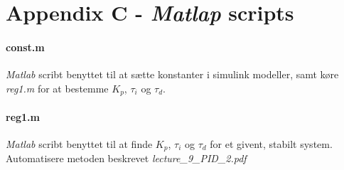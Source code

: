 \section*{Appendix C - \emph{Matlap} scripts}
\paragraph{ const.m }
	\emph{Matlab} scribt benyttet til at sætte konstanter i simulink modeller, samt
	køre \emph{reg1.m} for at bestemme $K_p$, $\tau_i$ og $\tau_d$.

	
\paragraph{ reg1.m }\label{app:reg1}
	\emph{Matlab} scribt benyttet til at finde $K_p$, $\tau_i$ og $\tau_d$ for et
	givent, stabilt system. Automatisere metoden beskrevet
	\emph{lecture\_9\_PID\_2.pdf}

